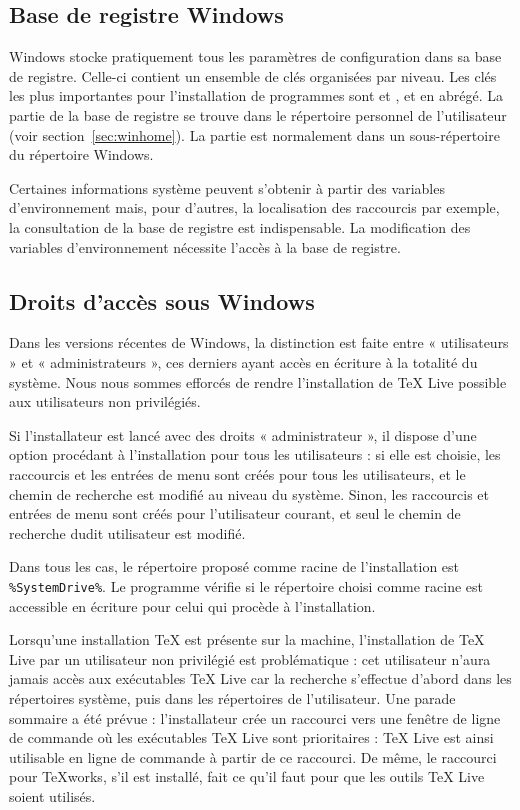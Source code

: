 \documentclass[german, english, french]{article}
\renewcommand{\TL}{\TeX{} Live\xspace}%
\begin{document}
\subsection{Base de registre Windows}
\label{sec:registry}

Windows stocke pratiquement tous les paramètres de configuration dans sa base de
registre. Celle-ci contient un ensemble de clés organisées par niveau.  Les clés
les plus importantes pour l'installation de programmes sont
 et ,  et
 en abrégé. La partie  de la base de registre se trouve
dans le répertoire personnel de l'utilisateur (voir
section~\ref{sec:winhome}). La partie  est normalement dans un
sous-répertoire du répertoire Windows.

Certaines informations système peuvent s'obtenir à partir des variables
d'environnement mais, pour d'autres, la localisation des raccourcis par exemple,
la consultation de la base de registre est indispensable.  La modification des
variables d'environnement nécessite l'accès à la base de registre.


\subsection{Droits d'accès sous Windows}
\label{sec:winpermissions}

Dans les versions récentes de Windows, la distinction est faite entre
« utilisateurs » et « administrateurs », ces derniers ayant accès en écriture
à la totalité du système. Nous nous sommes efforcés de rendre l'installation de
\TL{} possible aux utilisateurs non privilégiés.

Si l'installateur est lancé avec des droits « administrateur », il dispose d'une
option procédant à l'installation pour tous les utilisateurs : si elle est
choisie, les raccourcis et les entrées de menu sont créés pour tous les
utilisateurs, et le chemin de recherche est modifié au niveau du système. Sinon,
les raccourcis et entrées de menu sont créés pour l'utilisateur courant, et seul
le chemin de recherche dudit utilisateur est modifié.

Dans tous les cas, le répertoire proposé comme racine de l'installation est
\verb|%SystemDrive%|. %
Le programme  vérifie si le répertoire choisi comme racine est
accessible en écriture pour celui qui procède à l'installation.

Lorsqu'une installation \TeX{} est présente sur la machine, l'installation de
\TL{} par un utilisateur non privilégié est problématique : cet utilisateur
n'aura jamais accès aux exécutables \TL{} car la recherche s'effectue d'abord
dans les répertoires système, puis dans les répertoires de l'utilisateur.  Une
parade sommaire a été prévue : l'installateur crée un raccourci vers une fenêtre
de ligne de commande où les exécutables \TL sont prioritaires : \TL{} est ainsi
utilisable en ligne de commande à partir de ce raccourci. De même, le raccourci
pour \TeX{}works, s'il est installé, fait ce qu'il faut pour que les outils \TL
soient utilisés.
\end{document}
